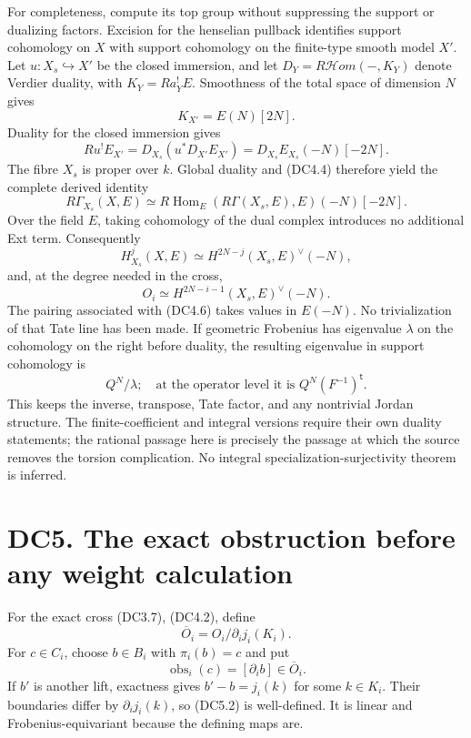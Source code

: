\documentclass[
]{report}
\begin{document}
For completeness, compute its top group without suppressing the support
or dualizing factors. Excision for the henselian pullback identifies
support cohomology on \(X\) with support cohomology on the finite-type
smooth model \(X'\). Let \(u:X_s\hookrightarrow X'\) be the closed
immersion, and let \(D_Y=R\mathcal Hom(-,K_Y)\) denote Verdier duality,
with \(K_Y=Ra_Y^!E\). Smoothness of the total space of dimension \(N\)
gives \[
K_{X'}=E(N)[2N].
\tag{DC4.3}
\] Duality for the closed immersion gives \[
Ru^!E_{X'}
 =D_{X_s}(u^*D_{X'}E_{X'})
 =D_{X_s}E_{X_s}(-N)[-2N].
\tag{DC4.4}
\] The fibre \(X_s\) is proper over \(k\). Global duality and (DC4.4)
therefore yield the complete derived identity \[
R\Gamma_{X_s}(X,E)
 \simeq R\operatorname{Hom}_E(R\Gamma(X_s,E),E)(-N)[-2N].
\tag{DC4.5}
\] Over the field \(E\), taking cohomology of the dual complex
introduces no additional Ext term. Consequently \[
H^j_{X_s}(X,E)
 \simeq H^{2N-j}(X_s,E)^\vee(-N),
\tag{DC4.6}
\] and, at the degree needed in the cross, \[
O_i\simeq H^{2N-i-1}(X_s,E)^\vee(-N).
\tag{DC4.7}
\] The pairing associated with (DC4.6) takes values in \(E(-N)\). No
trivialization of that Tate line has been made. If geometric Frobenius
has eigenvalue \(\lambda\) on the cohomology on the right before
duality, the resulting eigenvalue in support cohomology is \[
Q^N/\lambda;
\quad\text{at the operator level it is }Q^N(F^{-1})^{\mathsf t}.
\tag{DC4.8}
\] This keeps the inverse, transpose, Tate factor, and any nontrivial
Jordan structure. The finite-coefficient and integral versions require
their own duality statements; the rational passage here is precisely the
passage at which the source removes the torsion complication. No
integral specialization-surjectivity theorem is inferred.

\section{DC5. The exact obstruction before any weight
calculation}\label{dc5.-the-exact-obstruction-before-any-weight-calculation}

For the exact cross (DC3.7), (DC4.2), define \[
\overline O_i=O_i/\partial_i j_i(K_i).
\tag{DC5.1}
\] For \(c\in C_i\), choose \(b\in B_i\) with \(\pi_i(b)=c\) and put \[
\operatorname{obs}_i(c)
 =[\partial_i b]\in\overline O_i.
\tag{DC5.2}
\] If \(b'\) is another lift, exactness gives \(b'-b=j_i(k)\) for some
\(k\in K_i\). Their boundaries differ by \(\partial_i j_i(k)\), so
(DC5.2) is well-defined. It is linear and Frobenius-equivariant because
the defining maps are.
\end{document}
